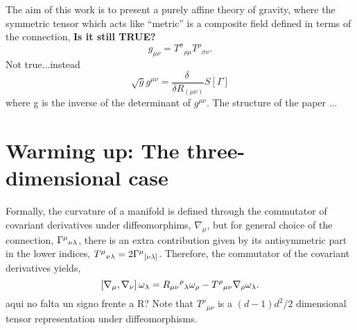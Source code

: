 \documentclass[twocolumn,
  showpacs,showkeys,prd,superscriptaddress]{revtex4-1}
\newcommand{\hl}[1]{{\color{red} \textbf{#1}}}
\begin{document}




The aim of this work is to present a purely affine theory of gravity, where the symmetric tensor which acts like ``metric'' is a composite field defined in terms of the connection, \hl{Is it still TRUE?}
\begin{equation}\nonumber
  g_{\mu\nu} = T^\sigma{}_{\rho\mu} T^\rho{}_{\sigma\nu}.
\end{equation}
{\color{blue} Not true...instead
\begin{equation}\label{metric}
  \sqrt{g}g^{\mu\nu} = \frac{\delta\ }{\delta R_{(\mu\nu)}} S[\Gamma]
\end{equation}
where g is the inverse of the determinant of $g^{\mu\nu}$. }
The structure of the paper ...




\section{Warming up: The three-dimensional case}

Formally, the curvature of a manifold is defined through the commutator of covariant derivatives under diffeomorphims, $\nabla_\mu$, but for general choice of the connection, $\Gamma^\mu{}_{\nu\lambda}$, there is an extra contribution given by its antisymmetric part in the lower indices, $T^\mu{}_{\nu\lambda}=2\Gamma^\mu{}_{[\nu\lambda]}$. Therefore, the commutator of the covariant derivatives yields,
\begin{equation}
  \left[\nabla_{{\mu}},\nabla_{{\nu}}\right]\omega_\lambda = R_{\mu\nu}{}^\rho{}_\lambda \omega _\rho - T^\rho{}_{\mu\nu}\nabla_{{\rho}}\omega_\lambda.\label{curvdef}
\end{equation}{\color{red}aqui no falta un signo frente a R?}
Note that $T^\rho{}_{\mu\nu}$ is a $(d-1)d^2/2$ dimensional tensor representation under diffeomorphisms.
\end{document}
